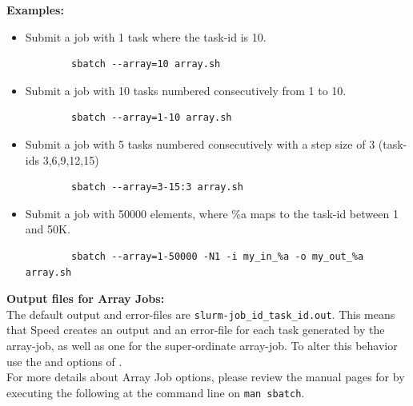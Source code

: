 \noindent \textbf{Examples:}
\begin{itemize}
	\item Submit a job with 1 task where the task-id is 10. 
	\begin{verbatim}
		sbatch --array=10 array.sh
	\end{verbatim}

	\item Submit a job with 10 tasks numbered consecutively from 1 to 10.
	\begin{verbatim}
		sbatch --array=1-10 array.sh
	\end{verbatim}

	\item Submit a job with 5 tasks numbered consecutively with a step size of 3 (task-ids 3,6,9,12,15)
	\begin{verbatim}
		sbatch --array=3-15:3 array.sh
	\end{verbatim}

	\item Submit a job with 50000 elements, where \%a maps to the task-id between 1 and 50K. 
	\begin{verbatim}
		sbatch --array=1-50000 -N1 -i my_in_%a -o my_out_%a array.sh
	\end{verbatim}
\end{itemize}

\noindent \textbf{Output files for Array Jobs:}\\
The default output and error-files are \texttt{slurm-job\_id\_task\_id.out}.
%
This means that Speed creates an output and an error-file for each task 
generated by the array-job, as well as one for the super-ordinate array-job. 
To alter this behavior use the  and  options of .\\

For more details about Array Job options, please review the manual pages for 
 by executing the following at the command line on 
\texttt{man sbatch}.
 

